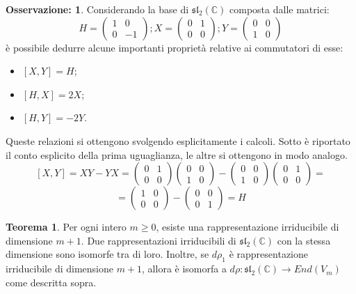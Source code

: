 \documentclass[12pt,a4paper]{report}
\theoremstyle{definition}
\newtheorem{Theo}[Def]{Teorema}
\theoremstyle{definition}
\theoremstyle{definition}
\theoremstyle{definition}
\newtheorem{Obs}[Def]{Osservazione:}
\begin{document}
\begin{Obs}\label{Obs1}
	Considerando la base di $\mathfrak{sl_2(\mathbb{C})}$ composta dalle matrici: $$H=
	\begin{pmatrix}
		1&0\\
		0&-1
	\end{pmatrix}; 
	X=\begin{pmatrix}
		0&1\\
		0&0
	\end{pmatrix};
	Y=\begin{pmatrix}
		0&0\\
		1&0
	\end{pmatrix}$$
è possibile dedurre alcune importanti proprietà relative ai commutatori di esse:
\begin{itemize}
	\item $[X,Y]=H$;
	\item $[H,X]=2X$;
	\item $[H,Y]=-2Y$.
\end{itemize}
Queste relazioni si ottengono svolgendo esplicitamente i calcoli. Sotto è riportato il conto esplicito della prima uguaglianza, le altre si ottengono in modo analogo.
$$[X,Y]=XY-YX=\begin{pmatrix}
	0&1\\
	0&0
\end{pmatrix}
\begin{pmatrix}
	0&0\\
	1&0
\end{pmatrix}-
\begin{pmatrix}
	0&0\\
	1&0
\end{pmatrix}
\begin{pmatrix}
	0&1\\
	0&0
\end{pmatrix}=$$$$=
\begin{pmatrix}
1&0\\
0&0
\end{pmatrix}-\begin{pmatrix}
0&0\\
0&1
\end{pmatrix}=H$$
\end{Obs}
\begin{Theo}\label{Theo2}
	Per ogni intero $m\geq 0$, esiste una rappresentazione irriducibile di dimensione $m+1$. Due rappresentazioni irriducibili di $\mathfrak{sl_2(\mathbb{C})}$ con la stessa dimensione sono isomorfe tra di loro. Inoltre, se $d\rho_1$ è rappresentazione irriducibile di dimensione $m+1$, allora è isomorfa a $d\rho:\mathfrak{sl_2(\mathbb{C})}\rightarrow End(V_m)$ come descritta sopra.
\end{Theo}
\end{document}
